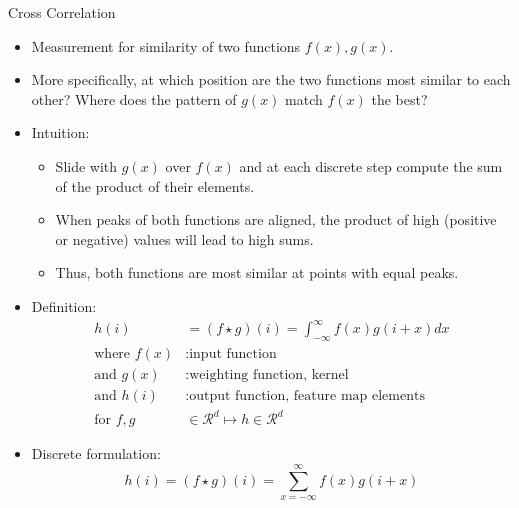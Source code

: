 \begin{vbframe}{Cross Correlation}
    \begin{itemize}
        \item Measurement for similarity of two functions $f(x), g(x)$.
        \item More specifically, at which position are the two functions most similar to each other? Where does the pattern of $g(x)$ match $f(x)$ the best?
        \item Intuition:
        \begin{itemize}
                \item Slide with $g(x)$ over $f(x)$ and at each discrete step compute the sum of the product of their elements.
                \item When peaks of both functions are aligned, the product of high (positive or negative) values will lead to high sums.
                \item Thus, both functions are most similar at points with equal peaks.
        \end{itemize}
    \end{itemize}
\framebreak
    \begin{itemize}
        \item Definition: \\
            \begin{equation*}
                \begin{split}
                    h(i) &= (f \star g)(i) = \int_{-\infty}^{\infty} f(x)g(i+x)dx \\
                    \text{where } f(x)&: \text{input function} \\
                    \text{and } g(x)&: \text{weighting function, kernel} \\
                    \text{and } h(i)&: \text{output function, feature map elements} \\
                    \text{for } f, g &\in \mathcal{R}^{d} \mapsto h \in \mathcal{R}^{d}
                \end{split}
            \end{equation*}
    \end{itemize}
\framebreak 
    \begin{itemize}
        \item Discrete formulation:
            \begin{equation*}
                h(i) = (f \star g)(i) = \sum_{x = -\infty}^{\infty} f(x)g(i+x)
            \end{equation*}

\end{itemize}
\end{vbframe}
